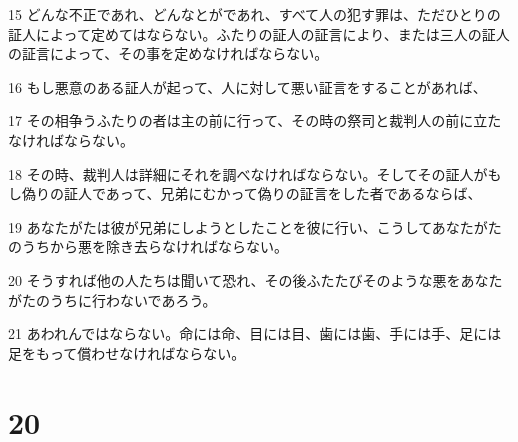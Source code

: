\par 15 どんな不正であれ、どんなとがであれ、すべて人の犯す罪は、ただひとりの証人によって定めてはならない。ふたりの証人の証言により、または三人の証人の証言によって、その事を定めなければならない。
\par 16 もし悪意のある証人が起って、人に対して悪い証言をすることがあれば、
\par 17 その相争うふたりの者は主の前に行って、その時の祭司と裁判人の前に立たなければならない。
\par 18 その時、裁判人は詳細にそれを調べなければならない。そしてその証人がもし偽りの証人であって、兄弟にむかって偽りの証言をした者であるならば、
\par 19 あなたがたは彼が兄弟にしようとしたことを彼に行い、こうしてあなたがたのうちから悪を除き去らなければならない。
\par 20 そうすれば他の人たちは聞いて恐れ、その後ふたたびそのような悪をあなたがたのうちに行わないであろう。
\par 21 あわれんではならない。命には命、目には目、歯には歯、手には手、足には足をもって償わせなければならない。

\chapter{20}

